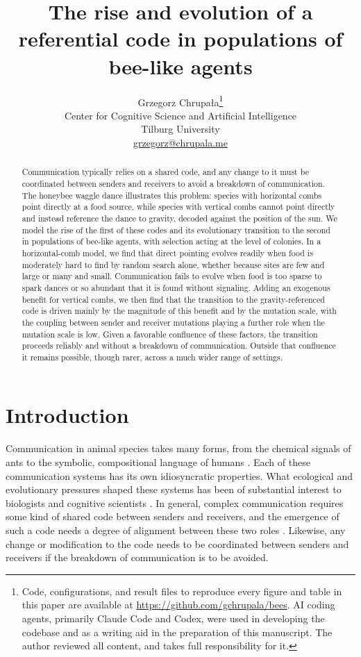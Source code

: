 \documentclass[11pt]{article}
\title{The rise and evolution of a referential code in
  populations of bee-like agents}
\author{Grzegorz Chrupała\thanks{Code, configurations, and result files to
    reproduce every figure and table in this paper are available at
    \url{https://github.com/gchrupala/bees}. AI coding agents, primarily
    Claude Code and Codex, were used in developing the codebase and as a
    writing aid in the preparation of this manuscript. The author reviewed all 
    content, and takes full responsibility for it.}\\
  Center for Cognitive Science and Artificial Intelligence\\
  Tilburg University\\
  \href{mailto:grzegorz@chrupala.me}{grzegorz@chrupala.me}}
\date{}
\begin{document}
\maketitle

\begin{abstract}
Communication typically relies on a shared code, and any change to it must be
coordinated between senders and receivers to avoid a breakdown of communication.
The honeybee waggle dance illustrates this problem: species with horizontal
combs point directly at a food source, while species with vertical combs cannot
point directly and instead reference the dance to gravity, decoded against the
position of the sun. We model the rise of the first of these codes and its
evolutionary transition to the second in populations of bee-like agents, with
selection acting at the level of colonies. In a horizontal-comb model, we find
that direct pointing evolves readily when food is moderately hard to find by
random search alone, whether because sites are few and large or many and small.
Communication fails to evolve when food is too sparse to spark dances or so
abundant that it is found without signaling. Adding an exogenous benefit for
vertical combs, we then find that the transition to the gravity-referenced code
is driven mainly by the magnitude of this benefit and by the mutation scale,
with the coupling between sender and receiver mutations playing a further role
when the mutation scale is low. Given a favorable confluence of these factors,
the transition proceeds reliably and without a breakdown of communication.
Outside that confluence it remains possible, though rarer, across a much wider
range of settings.
\end{abstract}

\section{Introduction}
\label{sec:intro}
Communication in animal species takes many forms, from the chemical
signals of ants \citep{jackson2006communication} to the symbolic,
compositional language of humans \citep{hockett1960origin}. Each of these communication systems has its own idiosyncratic
properties. What ecological and evolutionary pressures shaped these
systems has been of substantial interest to biologists and cognitive
scientists \citep{bradbury2011principles}.  In general, complex communication requires some kind of shared code
between senders and receivers, and the emergence of such a code
needs a degree of alignment between these two roles
\citep{lewis1969communication,skyrms2010signals}.
Likewise, any change or modification to the code needs to be
coordinated between senders and receivers if the breakdown of
communication is to be avoided.
\end{document}
